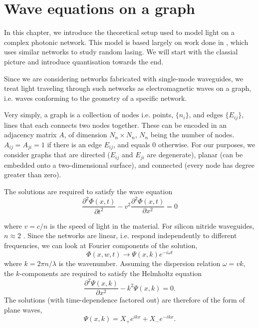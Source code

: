 \chapter{Wave equations on a graph}

In this chapter, we introduce the theoretical setup used to model light on a complex photonic network. This model is based largely on work done in \cite{Gaio2017}, which uses similar networks to study random lasing. We will start with the classial picture and introduce quantisation towards the end.

Since we are considering networks fabricated with single-mode waveguides, we treat light traveling through such networks as electromagnetic waves on a graph, i.e. waves conforming to the geometry of a specific network. 

Very simply, a graph is a collection of nodes i.e. points, $\{n_i\}$, and edges $\{E_{ij}\}$, lines that each connects two nodes together. These can be encoded in an adjacency matrix $A$, of dimension $N_n \times N_n$, $N_n$ being the number of nodes. $A_{ij} = A_{ji} = 1$ if there is an edge $E_{ij}$, and equals $0$ otherwise. For our purposes, we consider graphs that are directed ($E_{ij}$ and $E_{ji}$ are degenerate), planar (can be embedded onto a two-dimensional surface), and connected (every node has degree greater than zero).

The solutions are required to satisfy the wave equation
\begin{equation} \label{eq:wave_eq}
\frac{\partial^2 \Phi(x,t)}{\partial t^2} - v^2\frac{\partial^2 \Phi(x,t)}{\partial x^2} = 0
\end{equation}

where $v=c/n$ is the speed of light in the material. For silicon nitride waveguides, $n \approx 2$ \cite{Philipp1973}. Since the networks are linear, i.e. respond independently to different frequencies, we can look at Fourier components of the solution,
\begin{equation} \label{eq:k-space}
\Phi(x,w,t) \rightarrow \Psi(x,k)e^{-i\omega t}
\end{equation}
where $k=2\pi n/\lambda$ is the wavenumber. Assuming the dispersion relation $\omega = vk$, the $k$-components are required to satisfy the Helmholtz equation
\begin{equation} \label{eq:helmholtz_eq}
\frac{\partial^2 \Psi(x,k)}{\partial x^2} - k^2\Psi(x,k) = 0.
\end{equation}
The solutions (with time-dependence factored out) are therefore of the form of plane waves, 
\begin{equation}
\label{eq:planewave1}
\Psi(x,k) = X_+ e^{ikx} + X_- e^{-ikx}.
\end{equation}

